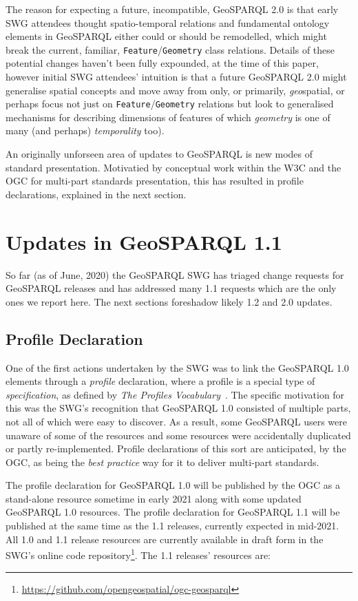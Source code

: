 \documentclass[runningheads]{llncs}
\begin{document}
The reason for expecting a future, incompatible, GeoSPARQL 2.0 is that early SWG attendees thought spatio-temporal relations
and fundamental ontology elements in GeoSPARQL either could or should be remodelled, which might break the current, familiar, 
\texttt{Feature}/\texttt{Geometry} class relations. Details of these potential changes haven't been fully expounded, at the 
time of this paper, however initial SWG attendees' intuition is that a future GeoSPARQL 2.0 might generalise spatial concepts and
move away from only, or primarily, \textit{geo}spatial, or perhaps focus not just on \texttt{Feature}/\texttt{Geometry} relations
but look to generalised mechanisms for describing dimensions of features of which \textit{geometry} is one of many (and perhaps)
\textit{temporality} too).

An originally unforseen area of updates to GeoSPARQL is new modes of standard presentation. Motivatied by conceptual work within the W3C and the OGC for  
multi-part standards presentation, this has resulted in profile declarations, explained 
in the next section.


\section{Updates in GeoSPARQL 1.1}\label{sec:newfeatures}
So far (as of June, 2020) the GeoSPARQL SWG has triaged change requests for GeoSPARQL releases and has addressed
many 1.1 requests which are the only ones we report here. The next sections foreshadow likely 1.2 and 2.0 updates.

\subsection{Profile Declaration}\label{sec:profiledec}
One of the first actions undertaken by the SWG was to link the GeoSPARQL 1.0 elements through a \textit{profile} 
declaration, where a profile is a special type of \textit{specification}, as defined by \textit{The Profiles Vocabulary}~\cite{atkinson_profiles_2020}. 
The specific motivation for this was the SWG's recognition that GeoSPARQL 1.0 consisted of multiple parts, not all
of which were easy to discover. As a result, some GeoSPARQL users were unaware of some of the resources and some
resources were accidentally duplicated or partly re-implemented. Profile declarations of this sort are anticipated, by the OGC, 
as being the \textit{best practice} way for it to deliver multi-part standards.

The profile declaration for GeoSPARQL 1.0 will be published by the OGC as a stand-alone resource sometime in early 2021 along with some 
updated GeoSPARQL 1.0 resources. The profile declaration for GeoSPARQL 1.1 will be published at the same time as the 
1.1 releases, currently expected in mid-2021. All 1.0 and 1.1 release resources are currently available in draft form 
in the SWG's online code repository\footnote{\url{https://github.com/opengeospatial/ogc-geosparql}}. The 1.1 releases' resources are:
\end{document}

